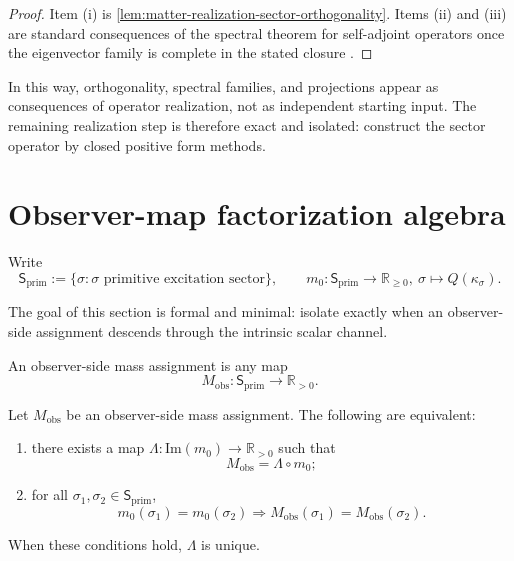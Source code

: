 \begin{proof}
Item \textup{(i)} is \cref{lem:matter-realization-sector-orthogonality}.
Items \textup{(ii)} and \textup{(iii)} are standard consequences of the
spectral theorem for self-adjoint operators once the eigenvector family is
complete in the stated closure \cite{Kato1995}.
\end{proof}

In this way, orthogonality, spectral families, and projections appear as
consequences of operator realization, not as independent starting input.
The remaining realization step is therefore exact and isolated:
construct the sector operator by closed positive form methods.

\section{Observer-map factorization algebra}
\label{sec:matter-realization-factorization-algebra}

Write
\[
  \mathsf S_{\mathrm{prim}}
  :=
  \{\sigma:\sigma\text{ primitive excitation sector}\},
  \qquad
  m_0:\mathsf S_{\mathrm{prim}}\to\mathbb R_{\ge0},
  \ \sigma\mapsto Q(\kappa_\sigma).
\]

The goal of this section is formal and minimal: isolate exactly when an
observer-side assignment descends through the intrinsic scalar channel.

\begin{definition}
\label{def:matter-realization-observer-map}
An observer-side mass assignment is any map
\[
  M_{\mathrm{obs}}:\mathsf S_{\mathrm{prim}}\to\mathbb R_{>0}.
\]
\end{definition}

\begin{theorem}
\label{thm:matter-realization-factorization-criterion}
Let \(M_{\mathrm{obs}}\) be an observer-side mass assignment.
The following are equivalent:
\begin{enumerate}[label=\textup{(\roman*)}]
\item there exists a map
      \(\Lambda:\mathrm{Im}(m_0)\to\mathbb R_{>0}\)
      such that
      \[
        M_{\mathrm{obs}}=\Lambda\circ m_0;
      \]
\item for all
      \(\sigma_1,\sigma_2\in\mathsf S_{\mathrm{prim}}\),
      \[
        m_0(\sigma_1)=m_0(\sigma_2)
        \Longrightarrow
        M_{\mathrm{obs}}(\sigma_1)=M_{\mathrm{obs}}(\sigma_2).
      \]
\end{enumerate}
When these conditions hold, \(\Lambda\) is unique.
\end{theorem}

